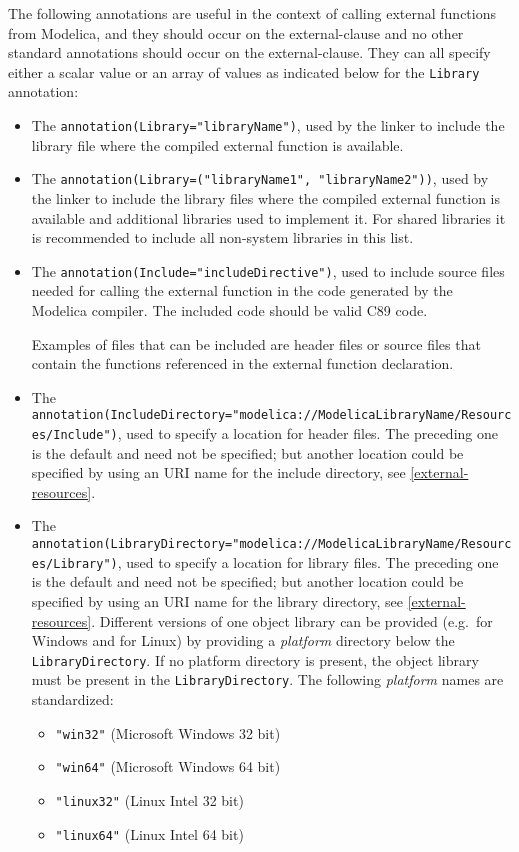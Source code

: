 The following annotations are useful in the context of calling external functions from Modelica, and they should occur on the external-clause and no other standard annotations should occur on the external-clause.
They can all specify either a scalar value or an array of values as indicated below for the \lstinline!Library! annotation:
\begin{itemize}
\item
  The \lstinline!annotation(Library="libraryName")!, used by the linker to include
  the library file where the compiled external function is available.
\item
  The \lstinline!annotation(Library=("libraryName1", "libraryName2"))!, used by the
  linker to include the library files where the compiled external
  function is available and additional libraries used to implement it.
  For shared libraries it is recommended to include all non-system
  libraries in this list.
\item
  The \lstinline!annotation(Include="includeDirective")!, used to include source files needed for calling the external function in the code
  generated by the Modelica compiler. The included code should be valid C89 code.
  \begin{nonnormative}
  Examples of files that can be included are header files or source files that contain the
  functions referenced in the external function declaration.
  \end{nonnormative}
\item
  The
  \lstinline!annotation(IncludeDirectory="modelica://ModelicaLibraryName/Resources/Include")!,
  used to specify a location for header files. The preceding one is the
  default and need not be specified; but another location could be
  specified by using an URI name for the include directory, see \cref{external-resources}.
\item
  The
  \lstinline!annotation(LibraryDirectory="modelica://ModelicaLibraryName/Resources/Library")!,
  used to specify a location for library files. The preceding one is the
  default and need not be specified; but another location could be
  specified by using an URI name for the library directory, see \cref{external-resources}.
  Different versions of one object library can be provided
  (e.g.\ for Windows and for Linux) by providing a
  \emph{platform} directory below the \lstinline!LibraryDirectory!. If no
  platform directory is present, the object library must be present
  in the \lstinline!LibraryDirectory!. The following \emph{platform} names are
  standardized:
  \begin{itemize}
  \item
    \lstinline!"win32"! (Microsoft Windows 32 bit)
  \item
    \lstinline!"win64"! (Microsoft Windows 64 bit)
  \item
    \lstinline!"linux32"! (Linux Intel 32 bit)
  \item
    \lstinline!"linux64"! (Linux Intel 64 bit)
  \end{itemize}
\end{itemize}

